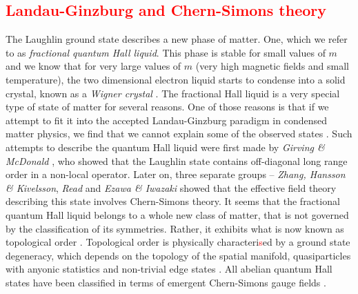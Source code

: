 \textcolor{red}{\subsection{Landau-Ginzburg and Chern-Simons theory}}


The Laughlin ground state describes a new phase of matter. One, which we refer to as \textit{fractional quantum Hall liquid}. This phase is stable for small values of $m$ and we know that for very large values of $m$ (very high magnetic fields and small temperature), the two dimensional electron liquid starts to condense into a solid crystal, known as a \textit{Wigner crystal} \cite{PhysRevLett.60.2765, PhysRev.46.1002, Wigner1938}. The fractional Hall liquid is a very special type of state of matter for several reasons. One of those reasons is that if we attempt to fit it into the accepted Landau-Ginzburg paradigm in condensed matter physics, we find that we cannot explain some of the observed states \cite{wen2004quantum}. Such attempts to describe the quantum Hall liquid were first made by \textit{Girving \& McDonald} \cite{PhysRevLett.58.1252}, who showed that the Laughlin state contains off-diagonal long range order in a non-local operator. Later on, three separate groups --  \textit{Zhang, Hansson \& Kivelsson}, \textit{Read} and \textit{Ezawa \& Iwazaki} \cite{PhysRevLett.62.82, PhysRevB.43.2637, Read1989} showed that the effective field theory describing this state involves Chern-Simons theory. It seems that the fractional quantum Hall liquid belongs to a whole new class of matter, that is not governed by the classification of its symmetries. Rather, it exhibits what is now known as topological order \cite{Wen:1995qn, TopOrderRigidStates}. Topological order is physically characteri\textcolor{red}{s}ed by a ground state degeneracy, which depends on the topology of the spatial manifold, quasiparticles with anyonic statistics and non-trivial edge states \cite{Wen:1995qn}. All abelian quantum Hall states have been classified in terms of emergent Chern-Simons gauge fields \cite{PhysRevB.46.2290}.

